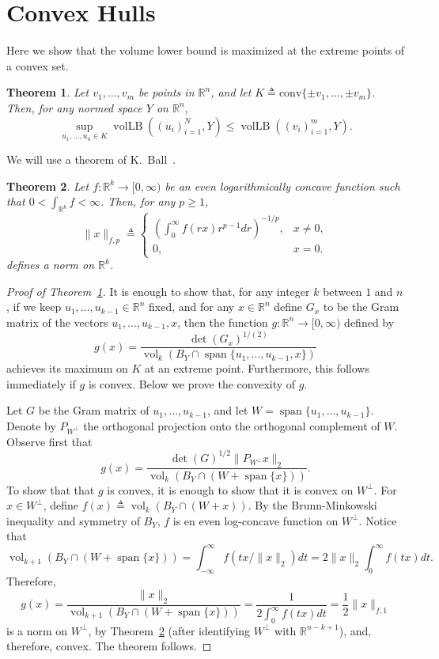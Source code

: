 \documentclass[12pt]{article}
\newtheorem{theorem}{Theorem}
\newcommand{\R}{{\mathbb{R}}}
\newcommand{\eqdef}{\triangleq}
\DeclareMathOperator{\vollb}{volLB}
\DeclareMathOperator{\vol}{vol}
\DeclareMathOperator{\lspan}{span}
\begin{document}
\section{Convex Hulls}

Here we show that the volume lower bound is maximized at the extreme
points of a convex set.

\begin{theorem}\label{thm:conv-hull}
  Let $v_1, \ldots, v_m$ be points in $\R^n$, and let $K \eqdef
  \mathrm{conv}\{\pm v_1, \ldots, \pm v_m\}$. Then, for any normed
  space $Y$ on $\R^n$, 
  \[
  \sup_{u_1, \ldots, u_n \in K}\vollb((u_i)_{i = 1}^N, Y)
  \le
  \vollb((v_i)_{i = 1}^m, Y).
  \]
\end{theorem}

We will use a theorem of K.~Ball~\cite{Ball88}.

\begin{theorem}\label{thm:ball-logconcave}
  Let $f: \R^k \to [0, \infty)$ be an even logarithmically concave
  function such that $0 < \int_{\R^k} f < \infty$. Then, for any $p
  \ge 1$, 
  \[
  \|x\|_{f,p} \eqdef 
  \begin{cases}
    \left(\int_0^\infty f(rx) r^{p-1}dr\right)^{-1/p}, &x \neq 0,\\
    0, &x = 0.
  \end{cases}
  \]
  defines a norm on $\R^k$. 
\end{theorem}


\begin{proof}[Proof of Theorem~\ref{thm:conv-hull}]
  It is enough to show that, for any integer $k$ between $1$ and $n$,
  if we keep $u_1, \ldots, u_{k-1} \in \R^n$ fixed, and for any $x\in
  \R^n$ define $G_x$ to be the Gram matrix of the vectors $u_1,
  \ldots, u_{k-1}, x$, then the function $g: \R^n \to [0, \infty)$
  defined by
  \[
  g(x) = \frac{\det(G_x)^{1/(2)}}{\vol_k(B_Y \cap \lspan\{u_1,
    \ldots, u_{k-1}, x\})}
  \]
  achieves its maximum on $K$ at an extreme point. Furthermore, this
  follows immediately if $g$ is convex. Below we prove the convexity
  of $g$.

  Let $G$ be the Gram matrix of $u_1, \ldots, u_{k-1}$, and let $W =
  \lspan\{u_1, \ldots, u_{k-1}\}$. Denote by $P_{W^\perp}$ the
  orthogonal projection onto the orthogonal complement of $W$.
  Observe first that
  \[
  g(x) = \frac{\det(G)^{1/2}\|P_{W^\perp}x\|_2}{\vol_k(B_Y \cap (W +
    \lspan\{x\}))}. 
  \]
  To show that that $g$ is convex, it is enough to show that it is
  convex on $W^\perp$.  For $x \in W^\perp$, define $f(x) \eqdef
  \vol_{k}(B_Y \cap (W + x))$. By the Brunn-Minkowski inequality and
  symmetry of $B_Y$, $f$ is en even log-concave function on
  $W^\perp$. Notice that
  \[
  \vol_{k+1}(B_Y \cap  (W + \lspan\{x\}))
  = 
  \int_{-\infty}^\infty{f(tx/\|x\|_2)dt} 
  = 
  2\|x\|_2 \int_{0}^\infty{f(tx)dt}.
  \]
  Therefore, 
  \[
  g(x) = 
  \frac{\|x\|_2}{\vol_{k+1}(B_Y \cap  (W + \lspan\{x\}))}
  = 
  \frac{1}{2\int_{0}^\infty{f(tx)dt}}
  = \frac{1}{2}\|x\|_{f,1}
  \]
  is a norm on $W^\perp$, by Theorem~\ref{thm:ball-logconcave} (after
  identifying $W^\perp$ with $\R^{n-k+1}$), and, therefore, convex. The
  theorem follows.
\end{proof}
\end{document}

